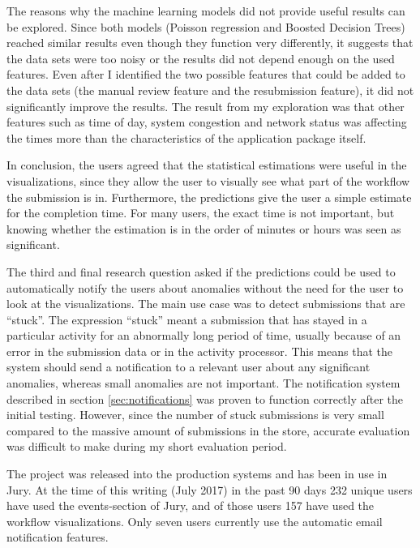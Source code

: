 
The reasons why the machine learning models did not provide useful results can be explored.
Since both models (Poisson regression and Boosted Decision Trees) reached similar results even though they function very differently, it suggests that the data sets were too noisy or the results did not depend enough on the used features.
Even after I identified the two possible features that could be added to the data sets (the manual review feature and the resubmission feature), it did not significantly improve the results.
The result from my exploration was that other features such as time of day, system congestion and network status was affecting the times more than the characteristics of the application package itself.

In conclusion, the users agreed that the statistical estimations were useful in the visualizations, since they allow the user to visually see what part of the workflow the submission is in.
Furthermore, the predictions give the user a simple estimate for the completion time. 
For many users, the exact time is not important, but knowing whether the estimation is in the order of minutes or hours was seen as significant.


The third and final research question asked if the predictions could be used to automatically notify the users about anomalies without the need for the user to look at the visualizations.
The main use case was to detect submissions that are ``stuck''.
The expression ``stuck'' meant a submission that has stayed in a particular activity for an abnormally long period of time, usually because of an error in the submission data or in the activity processor.
This means that the system should send a notification to a relevant user about any significant anomalies, whereas small anomalies are not important.
The notification system described in section \ref{sec:notifications} was proven to function correctly after the initial testing. 
However, since the number of stuck submissions is very small compared to the massive amount of submissions in the store, accurate evaluation was difficult to make during my short evaluation period.

The project was released into the production systems and has been in use in Jury.
At the time of this writing (July 2017) in the past 90 days 232 unique users have used the events-section of Jury, and of those users 157 have used the workflow visualizations.
Only seven users currently use the automatic email notification features.


